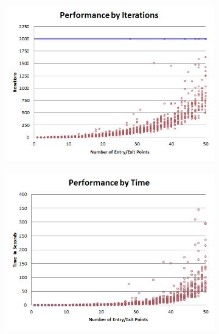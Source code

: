 \begin{figure}[t]
 \centering
%
\begin{subfigure}[b]{0.48\linewidth}
 \centering
	\includegraphics[width=\linewidth]{images/res-iter-graph.png}
	\caption{}
 \end{subfigure}
%
\begin{subfigure}[b]{0.48\linewidth}
 \centering
	\includegraphics[width=\linewidth]{images/res-time-graph.png}
	\caption{}
 \end{subfigure}
% 

\end{figure}
